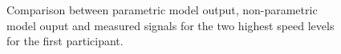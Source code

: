  \begin{figure}
    \centering
    \begin{subfigure}[b]{\textwidth}
        \centering
        \caption{}
        \label{fig:model3}
    \end{subfigure}
    \begin{subfigure}[b]{\textwidth}
        \centering
        \caption{}            
        \label{fig:model4}
    \end{subfigure}
    \caption{Comparison between parametric model output, non-parametric model ouput and measured signals for the two highest speed levels for the first participant.}
    \label{fig:model34}
 \end{figure}
 
